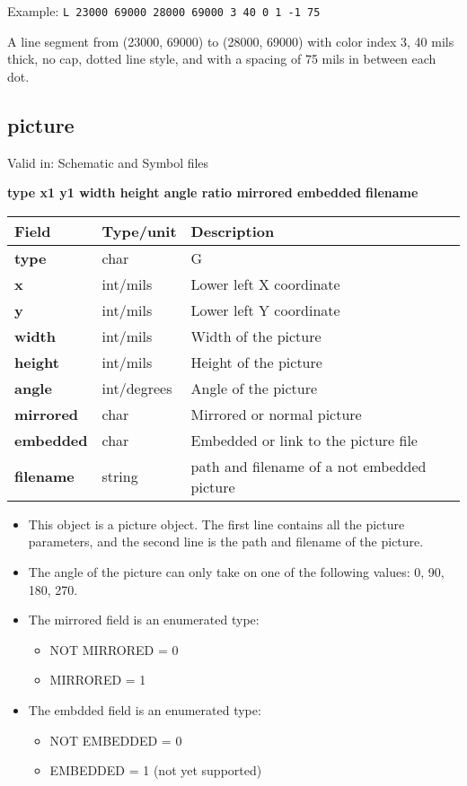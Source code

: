 \documentclass{article}
\begin{document}
Example:\newline
{\tt L 23000 69000 28000 69000 3 40 0 1 -1 75}

A line segment from (23000, 69000) to (28000, 69000) with color index 3, 
40 mils thick, no cap, dotted line style, and with a spacing of 75 mils 
in between each dot.

\subsection{picture}

Valid in: Schematic and Symbol files

{\bf type x1 y1 width height angle ratio mirrored embedded}
\newline
{\bf filename}

\begin{table}[h]
\begin{tabular}{|l|l|l|} \hline
Field 		& Type/unit 	& Description \\ \hline 
\hline
{\bf type} 	& char		& G \\ \hline
{\bf x} 	& int/mils 	& Lower left X coordinate \\ \hline 
{\bf y} 	& int/mils	& Lower left Y coordinate \\ \hline
{\bf width} 	& int/mils	& Width of the picture \\ \hline
{\bf height} 	& int/mils	& Height of the picture \\ \hline
{\bf angle} 	& int/degrees	& Angle of the picture \\ \hline
{\bf mirrored} 	& char          & Mirrored or normal picture \\ \hline
{\bf embedded} 	& char          & Embedded or link to the picture file\\ \hline
{\bf filename} 	& string        & path and filename of a not embedded  picture \\ \hline
\end{tabular}
\end{table}

\begin{itemize}
\item This object is a picture object. The first line contains all the picture 
      parameters, and the second line is the path and filename of the picture.
\item The angle of the picture can only take on one of the following values: 
      0, 90, 180, 270.
\item The mirrored field is an enumerated type:
\begin{itemize}
	\item NOT MIRRORED = 0 
	\item MIRRORED = 1
\end{itemize}
\item The embdded field is an enumerated type:
\begin{itemize}
	\item NOT EMBEDDED = 0
	\item EMBEDDED = 1 (not yet supported)
\end{itemize}
\end{itemize}
\end{document}
